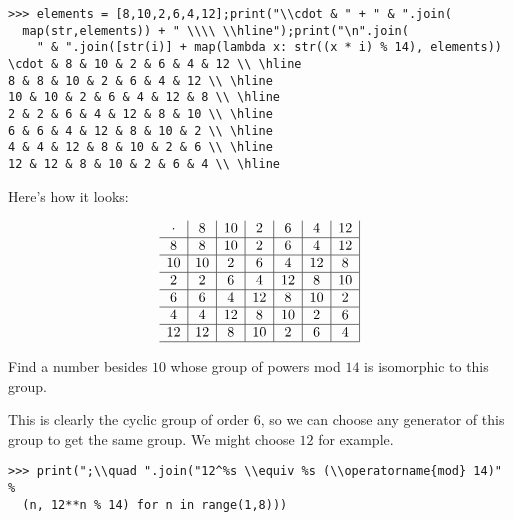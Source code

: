 \documentclass[../gatm_answers.tex]{subfiles}
\begin{document}
\begin{verbatim}
>>> elements = [8,10,2,6,4,12];print("\\cdot & " + " & ".join(
  map(str,elements)) + " \\\\ \\hline");print("\n".join(
    " & ".join([str(i)] + map(lambda x: str((x * i) % 14), elements))
\cdot & 8 & 10 & 2 & 6 & 4 & 12 \\ \hline
8 & 8 & 10 & 2 & 6 & 4 & 12 \\ \hline
10 & 10 & 2 & 6 & 4 & 12 & 8 \\ \hline
2 & 2 & 6 & 4 & 12 & 8 & 10 \\ \hline
6 & 6 & 4 & 12 & 8 & 10 & 2 \\ \hline
4 & 4 & 12 & 8 & 10 & 2 & 6 \\ \hline
12 & 12 & 8 & 10 & 2 & 6 & 4 \\ \hline
\end{verbatim}

Here's how it looks:

$$\begin{array}{c|c|c|c|c|c|c|}
\cdot & 8 & 10 & 2 & 6 & 4 & 12 \\ \hline
8 & 8 & 10 & 2 & 6 & 4 & 12 \\ \hline
10 & 10 & 2 & 6 & 4 & 12 & 8 \\ \hline
2 & 2 & 6 & 4 & 12 & 8 & 10 \\ \hline
6 & 6 & 4 & 12 & 8 & 10 & 2 \\ \hline
4 & 4 & 12 & 8 & 10 & 2 & 6 \\ \hline
12 & 12 & 8 & 10 & 2 & 6 & 4 \\ \hline
\end{array}$$

\begin{inner_problem}
\item Find a number besides $10$ whose group of powers mod $14$ is isomorphic to this group.
\end{inner_problem}

This is clearly the cyclic group of order $6$, so we can choose any generator of this group to get the same group. We might choose $12$ for example.

\begin{verbatim}
>>> print(";\\quad ".join("12^%s \\equiv %s (\\operatorname{mod} 14)" %
  (n, 12**n % 14) for n in range(1,8)))
\end{verbatim}
\end{document}
